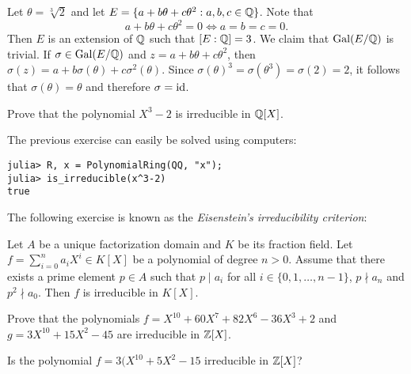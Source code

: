\begin{example}
	Let $\theta=\sqrt[3]{2}$ and let $E=\{a+b\theta+c\theta^2:a,b,c\in\mathbb{Q}\}$. Note that 
\[
	a+b\theta+c\theta^2=0 \Longleftrightarrow a=b=c=0. 
\]
Then $E$ is an extension of $\mathbb{Q}$ such that $[E:\mathbb{Q}]=3$. We claim
that $\operatorname{Gal}(E/\mathbb{Q})$ is trivial. If 
$\sigma\in\operatorname{Gal}(E/\mathbb{Q})$ and $z=a+b\theta+c\theta^2$, then
$\sigma(z)=a+b\sigma(\theta)+c\sigma^2(\theta)$. Since
$\sigma(\theta)^3=\sigma(\theta^3)=\sigma(2)=2$, it follows
that $\sigma(\theta)=\theta$ and therefore
$\sigma=\operatorname{id}$. 
\end{example}

\begin{exercise}
    Prove that the polynomial $X^3-2$ is irreducible in $\mathbb{Q}[X]$.  
\end{exercise}

The previous exercise can easily be solved using
computers: 
\begin{lstlisting}
julia> R, x = PolynomialRing(QQ, "x");
julia> is_irreducible(x^3-2)
true
\end{lstlisting}

The following exercise is known as the 
\emph{Eisenstein's irreducibility criterion}:

\begin{exercise}
    Let $A$ be a unique factorization domain and $K$ be its fraction field. 
    Let $f=\sum_{i=0}^n a_iX^i\in K[X]$ be a polynomial of degree $n>0$. 
    Assume that there exists a prime element $p\in A$ such that
    $p\mid a_i$ for all $i\in\{0,1,\dots,n-1\}$, $p\nmid a_n$ and
    $p^2\nmid a_0$. Then $f$ is irreducible in $K[X]$. 
\end{exercise}

\begin{exercise}
    Prove that
    the polynomials 
    $f=X^{10}+60X^7+82X^6-36X^3+2$ and 
    $g=3X^{10}+15X^2-45$ are irreducible in $\mathbb{Z}[X]$. 
\end{exercise}

\begin{exercise}
    Is the polynomial $f=3(X^{10}+5X^2-15$ irreducible in $\mathbb{Z}[X]$? 
\end{exercise}
